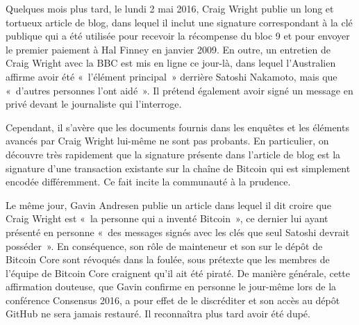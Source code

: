 Quelques mois plus tard, le lundi 2 mai 2016, Craig Wright publie un long et tortueux article de blog, dans lequel il inclut une signature correspondant à la clé publique qui a été utilisée pour recevoir la récompense du bloc 9 et pour envoyer le premier paiement à Hal Finney en janvier 2009. En outre, un entretien de Craig Wright avec la BBC est mis en ligne ce jour-là, dans lequel l'Australien affirme avoir été «~l'élément principal~» derrière Satoshi Nakamoto, mais que «~d'autres personnes l'ont aidé~». Il prétend également avoir signé un message en privé devant le journaliste qui l'interroge.

Cependant, il s'avère que les documents fournis dans les enquêtes et les éléments avancés par Craig Wright lui-même ne sont pas probants. En particulier, on découvre très rapidement que la signature présente dans l'article de blog est la signature d'une transaction existante sur la chaîne de Bitcoin qui est simplement encodée différemment. Ce fait incite la communauté à la prudence.

Le même jour, Gavin Andresen publie un article dans lequel il dit croire que Craig Wright est «~la personne qui a inventé Bitcoin~», ce dernier lui ayant présenté en personne «~des messages signés avec les clés que seul Satoshi devrait posséder~». En conséquence, son rôle de mainteneur et son  sur le dépôt de Bitcoin Core sont révoqués dans la foulée, sous prétexte que les membres de l'équipe de Bitcoin Core craignent qu'il ait été piraté. De manière générale, cette affirmation douteuse, que Gavin confirme en personne le jour-même lors de la conférence Consensus 2016, a pour effet de le discréditer et son accès au dépôt GitHub ne sera jamais restauré. Il reconnaîtra plus tard avoir été dupé.

